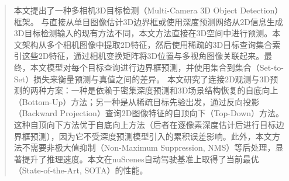 \begin{abstract}
本文提出了一种多相机3D目标检测（Multi-Camera 3D Object Detection）框架。
与直接从单目图像估计3D边界框或使用深度预测网络从2D信息生成3D目标检测输入的现有方法不同，本文方法直接在3D空间中进行预测。本文架构从多个相机图像中提取2D特征，然后使用稀疏的3D目标查询集合索引这些2D特征，通过相机变换矩阵将3D位置与多视角图像关联起来。最终，本文模型对每个目标查询进行边界框预测，并使用集合到集合（Set-to-Set）损失来衡量预测与真值之间的差异。
本文研究了连接2D观测与3D预测的两种方案：一种是依赖于密集深度预测和3D场景结构恢复的自底向上（Bottom-Up）方法；另一种是从稀疏目标先验出发，通过反向投影（Backward Projection）查询2D图像特征的自顶向下（Top-Down）方法。
这种自顶向下方法优于自底向上方法（后者在逐像素深度估计后进行目标边界框预测），因为它不受深度预测模型引入的累积误差影响。此外，本文方法不需要非极大值抑制（Non-Maximum Suppression, NMS）等后处理，显著提升了推理速度。本文在nuScenes自动驾驶基准上取得了当前最优（State-of-the-Art, SOTA）的性能。
\end{abstract}

